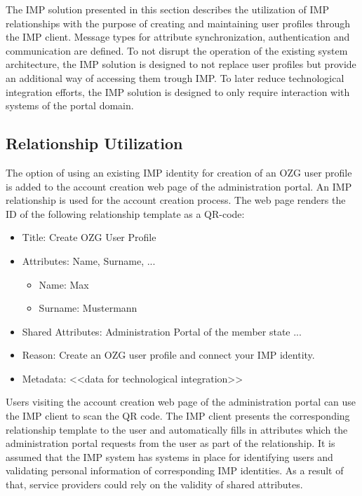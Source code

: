 The IMP solution presented in this section describes the utilization of IMP relationships with the purpose of creating and maintaining user profiles through the IMP client. Message types for attribute synchronization, authentication and communication are defined. To not disrupt the operation of the existing system architecture, the IMP solution is designed to not replace user profiles but provide an additional way of accessing them trough IMP. To later reduce technological integration efforts, the IMP solution is designed to only require interaction with systems of the portal domain.

\subsection{Relationship Utilization}
The option of using an existing IMP identity for creation of an OZG user profile is added to the account creation web page of the administration portal. An IMP relationship is used for the account creation process. The web page renders the ID of the following relationship template as a QR-code: 

\begin{itemize}
    \item Title: Create OZG User Profile
    \item Attributes: Name, Surname, ... 
    \begin{itemize}
        \item Name: Max
        \item Surname: Mustermann
    \end{itemize}
    \item Shared Attributes: Administration Portal of the member state ...
    \item Reason: Create an OZG user profile and connect your IMP identity.
    \item Metadata: <<data for technological integration>>
\end{itemize}

Users visiting the account creation web page of the administration portal can use the IMP client to scan the QR code. The IMP client presents the corresponding relationship template to the user and automatically fills in attributes which the administration portal requests from the user as part of the relationship. It is assumed that the IMP system has systems in place for identifying users and validating personal information of corresponding IMP identities. As a result of that, service providers could rely on the validity of shared attributes.

